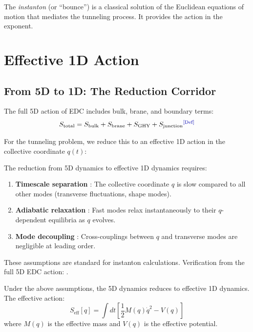 The \emph{instanton} (or ``bounce'') is a classical solution of the Euclidean
equations of motion that mediates the tunneling process. It provides the
action in the exponent.

\section{Effective 1D Action}
\label{sec:instanton:action}


\subsection{From 5D to 1D: The Reduction Corridor}

The full 5D action of EDC includes bulk, brane, and boundary terms:
\begin{equation}
    S_{\text{total}} = S_{\text{bulk}} + S_{\text{brane}} + S_{\text{GHY}} + S_{\text{junction}}
    \tagDef
\end{equation}

For the tunneling problem, we reduce this to an effective 1D action in the
collective coordinate $q(t)$:

\begin{assumptionbox}[title=Assumptions: 5D$\to$1D Reduction]
    The reduction from 5D dynamics to effective 1D dynamics requires:
    \begin{enumerate}
        \item \textbf{Timescale separation} \tagP: The collective coordinate $q$ is slow
              compared to all other modes (transverse fluctuations, shape modes).
        \item \textbf{Adiabatic relaxation} \tagP: Fast modes relax instantaneously to
              their $q$-dependent equilibria as $q$ evolves.
        \item \textbf{Mode decoupling} \tagP: Cross-couplings between $q$ and transverse
              modes are negligible at leading order.
    \end{enumerate}
    These assumptions are standard for instanton calculations.
    Verification from the full 5D EDC action: \tagOPEN.
\end{assumptionbox}

\begin{derivationbox}[title=5D$\to$1D Reduction (Adiabatic Approximation)]
    Under the above assumptions, the 5D dynamics reduces to effective 1D dynamics.
    The effective action:
    \begin{equation}
        S_{\text{eff}}[q] = \int dt \left[ \frac{1}{2} M(q) \dot{q}^2 - V(q) \right]
        \label{eq:Seff}
    \end{equation}
    where $M(q)$ is the effective mass and $V(q)$ is the effective potential.
    \tagDc
\end{derivationbox}


